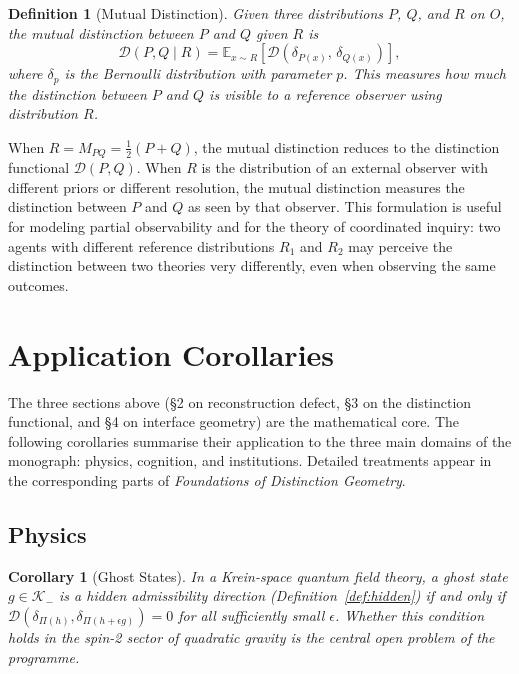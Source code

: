 \documentclass[12pt,a4paper]{article}
\newtheorem{corollary}[theorem]{Corollary}
\newtheorem{definition}[theorem]{Definition}
\theoremstyle{remark}
\theoremstyle{definition}
\begin{document}
\begin{definition}[Mutual Distinction]
Given three distributions $P$, $Q$, and $R$ on $O$, the
\emph{mutual distinction} between $P$ and $Q$ given $R$ is
\begin{equation}
  \mathcal{D}(P, Q \mid R)
  = \mathbb{E}_{x \sim R}\!\left[
      \mathcal{D}(\delta_{P(x)},\, \delta_{Q(x)})
    \right],
\end{equation}
where $\delta_{p}$ is the Bernoulli distribution with parameter $p$.
This measures how much the distinction between $P$ and $Q$ is visible
to a reference observer using distribution $R$.
\end{definition}

When $R = M_{PQ} = \frac{1}{2}(P+Q)$, the mutual distinction reduces
to the distinction functional $\mathcal{D}(P,Q)$. When $R$ is the
distribution of an external observer with different priors or different
resolution, the mutual distinction measures the distinction between $P$
and $Q$ as seen by that observer. This formulation is useful for modeling
partial observability and for the theory of coordinated inquiry: two
agents with different reference distributions $R_1$ and $R_2$ may
perceive the distinction between two theories very differently, even
when observing the same outcomes.


\section{Application Corollaries}

The three sections above (§2 on reconstruction defect, §3 on the
distinction functional, and §4 on interface geometry) are the mathematical
core. The following corollaries summarise their application to the
three main domains of the monograph: physics, cognition, and institutions.
Detailed treatments appear in the corresponding parts of \emph{Foundations
of Distinction Geometry}.

\subsection{Physics}

\begin{corollary}[Ghost States]
In a Krein-space quantum field theory, a ghost state $g \in \mathcal{K}_-$
is a hidden admissibility direction (Definition~\ref{def:hidden}) if and
only if $\mathcal{D}(\delta_{\Pi(h)}, \delta_{\Pi(h + \epsilon g)}) = 0$ for all
sufficiently small $\epsilon$. Whether this condition holds in the spin-2
sector of quadratic gravity is the central open problem of the programme.
\end{corollary}
\end{document}
